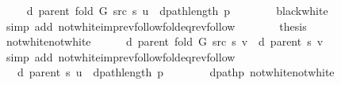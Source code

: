 \begin{isabellebody}
\ \isamarkupfalse%
\ {\isachardoublequoteopen}{\isachardot}{\kern0pt}{\isachardot}{\kern0pt}{\isachardot}{\kern0pt}\ {\isacharequal}{\kern0pt}\ d\ {\isacharparenleft}{\kern0pt}parent\ {\isacharparenleft}{\kern0pt}fold\ G\ src\ s{\isacharparenright}{\kern0pt}{\isacharparenright}{\kern0pt}\ u\ {\isacharplus}{\kern0pt}\ dpath{\isacharunderscore}{\kern0pt}length\ p{\isachardoublequoteclose}\isanewline
\ \ \ \ \ \ \isamarkupfalse%
\ black{\isacharunderscore}{\kern0pt}white\isanewline
\ \ \ \ \ \ \isamarkupfalse%
\ {\isacharparenleft}{\kern0pt}simp\ add{\isacharcolon}{\kern0pt}\ not{\isacharunderscore}{\kern0pt}white{\isacharunderscore}{\kern0pt}imp{\isacharunderscore}{\kern0pt}rev{\isacharunderscore}{\kern0pt}follow{\isacharunderscore}{\kern0pt}fold{\isacharunderscore}{\kern0pt}eq{\isacharunderscore}{\kern0pt}rev{\isacharunderscore}{\kern0pt}follow{\isacharparenright}{\kern0pt}\isanewline
\ \ \ \ \isamarkupfalse%
\ \isamarkupfalse%
\ {\isacharquery}{\kern0pt}thesis\isanewline
\ \ \ \ \ \ \isacommand{{\isachardot}{\kern0pt}}\isamarkupfalse%
\isanewline
\ \ \isamarkupfalse%
\isanewline
\ \ \ \ \isamarkupfalse%
\ not{\isacharunderscore}{\kern0pt}white{\isacharunderscore}{\kern0pt}not{\isacharunderscore}{\kern0pt}white\isanewline
\ \ \ \ \isamarkupfalse%
\ {\isachardoublequoteopen}d\ {\isacharparenleft}{\kern0pt}parent\ {\isacharparenleft}{\kern0pt}fold\ G\ src\ s{\isacharparenright}{\kern0pt}{\isacharparenright}{\kern0pt}\ v\ {\isacharequal}{\kern0pt}\ d\ {\isacharparenleft}{\kern0pt}parent\ s{\isacharparenright}{\kern0pt}\ v{\isachardoublequoteclose}\isanewline
\ \ \ \ \ \ \isamarkupfalse%
\ {\isacharparenleft}{\kern0pt}simp\ add{\isacharcolon}{\kern0pt}\ not{\isacharunderscore}{\kern0pt}white{\isacharunderscore}{\kern0pt}imp{\isacharunderscore}{\kern0pt}rev{\isacharunderscore}{\kern0pt}follow{\isacharunderscore}{\kern0pt}fold{\isacharunderscore}{\kern0pt}eq{\isacharunderscore}{\kern0pt}rev{\isacharunderscore}{\kern0pt}follow{\isacharparenright}{\kern0pt}\isanewline
\ \ \ \ \isamarkupfalse%
\ \isamarkupfalse%
\ {\isachardoublequoteopen}{\isachardot}{\kern0pt}{\isachardot}{\kern0pt}{\isachardot}{\kern0pt}\ {\isasymle}\ d\ {\isacharparenleft}{\kern0pt}parent\ s{\isacharparenright}{\kern0pt}\ u\ {\isacharplus}{\kern0pt}\ dpath{\isacharunderscore}{\kern0pt}length\ p{\isachardoublequoteclose}\isanewline
\ \ \ \ \ \ \isamarkupfalse%
\ dpath{\isacharunderscore}{\kern0pt}p\ not{\isacharunderscore}{\kern0pt}white{\isacharunderscore}{\kern0pt}not{\isacharunderscore}{\kern0pt}white\isanewline

\end{isabellebody}
